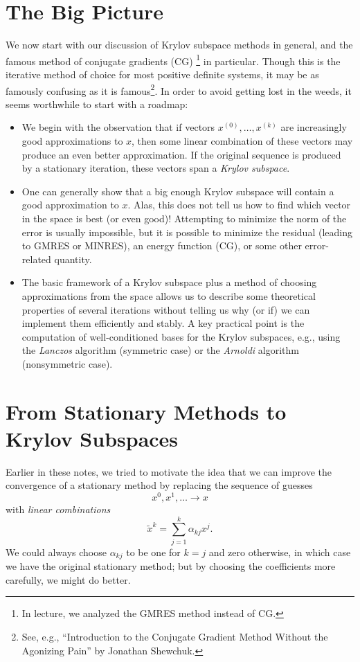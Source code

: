 \documentclass[12pt, leqno]{article}
\begin{document}

\section{The Big Picture}

We now start with our discussion of Krylov subspace
methods in general, and the famous method of conjugate gradients (CG)
\footnote{In lecture, we analyzed the GMRES method
instead of CG.}
in particular.  Though this is the iterative method of choice for most
positive definite systems, it may be as famously confusing as it is
famous\footnote{%
  See, e.g., ``Introduction to the Conjugate Gradient
  Method Without the Agonizing Pain'' by Jonathan Shewchuk.}.
In order to avoid getting lost in the weeds, it seems worthwhile to
start with a roadmap:
\begin{itemize}
\item
  We begin with the observation that if vectors $x^{(0)}, \ldots,
  x^{(k)}$ are increasingly good approximations to $x$, then some
  linear combination of these vectors may produce an even better
  approximation.  If the original sequence is produced by a stationary
  iteration, these vectors span a {\em Krylov subspace}.
\item
  One can generally show that a big enough Krylov subspace will
  contain a good approximation to $x$.  Alas, this does not tell us
  how to find which vector in the space is best (or even good)!
  Attempting to minimize the norm of the error is usually impossible,
  but it is possible to minimize the residual (leading to GMRES or
  MINRES), an energy function (CG), or some other error-related
  quantity.
\item
  The basic framework of a Krylov subspace plus a method of choosing
  approximations from the space allows us to describe some theoretical
  properties of several iterations without telling us why (or if) we
  can implement them efficiently and stably.  A key practical point is
  the computation of well-conditioned bases for the Krylov subspaces,
  e.g., using the {\em Lanczos} algorithm (symmetric case) or the
  {\em Arnoldi} algorithm (nonsymmetric case).
\end{itemize}

\section{From Stationary Methods to Krylov Subspaces}

Earlier in these notes, we tried to motivate the idea that
we can improve the convergence of a stationary method by replacing
the sequence of guesses
\[
  x^0, x^1, \ldots \rightarrow x
\]
with {\em linear combinations}
\[
  \tilde{x}^k = \sum_{j=1}^k \alpha_{kj} x^j.
\]
We could always choose $\alpha_{kj}$ to be one for $k = j$ and zero
otherwise, in which case we have the original stationary method;
but by choosing the coefficients more carefully, we might do better.
\end{document}
